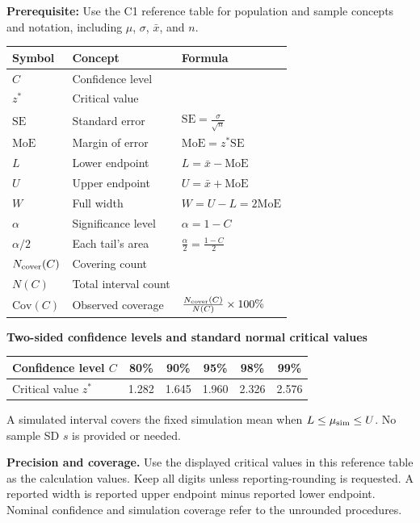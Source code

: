 \textbf{Prerequisite:} Use the C1 reference table for population and sample concepts
and notation, including $\mu$, $\sigma$, $\bar{x}$, and $n$.
\begingroup
\small
\setlength{\tabcolsep}{4pt}
\renewcommand{\arraystretch}{1.12}
\noindent\begin{tabularx}{\linewidth}{@{}>{\raggedright\arraybackslash}p{.12\linewidth}>{\raggedright\arraybackslash}p{.23\linewidth}>{\raggedright\arraybackslash}X@{}}
\toprule
\textbf{Symbol} & \textbf{Concept} & \textbf{Formula} \\
\midrule
$C$ & Confidence level & \\
$z^*$ & Critical value & \\
$\mathrm{SE}$ & Standard error & $\mathrm{SE}=\frac{\sigma}{\sqrt n}$ \\
$\mathrm{MoE}$ & Margin of error & $\mathrm{MoE}=z^*\mathrm{SE}$ \\
$L$ & Lower endpoint & $L=\bar{x}-\mathrm{MoE}$ \\
$U$ & Upper endpoint & $U=\bar{x}+\mathrm{MoE}$ \\
$W$ & Full width & $W=U-L=2\mathrm{MoE}$ \\
$\alpha$ & Significance level & $\alpha=1-C$ \\
$\alpha/2$ & Each tail's area & $\frac{\alpha}{2}=\frac{1-C}{2}$ \\
$N_{\rm cover}(C)$ & Covering count & \\
$N(C)$ & Total interval count & \\
$\mathrm{Cov}(C)$ & Observed coverage & $\frac{N_{\rm cover}(C)}{N(C)}\times100\%$ \\
\bottomrule
\end{tabularx}\par
\endgroup
\begin{center}
\small
\textbf{Two-sided confidence levels and standard normal critical values}\par
\begin{tabularx}{.80\linewidth}{@{}>{\raggedright\arraybackslash}Xccccc@{}}\toprule
Confidence level $C$&80\%&90\%&95\%&98\%&99\%\\\midrule
Critical value $z^*$&1.282&1.645&1.960&2.326&2.576\\\bottomrule
\end{tabularx}\end{center}
A simulated interval covers the fixed simulation mean when $L\leq\mu_{\rm sim}\leq U$.
No sample SD $s$ is provided or needed.

\textbf{Precision and coverage.} Use the displayed critical values in this reference table as the calculation values. Keep all digits unless reporting-rounding is requested. A reported width is reported upper endpoint minus reported lower endpoint. Nominal confidence and simulation coverage refer to the unrounded procedures.


